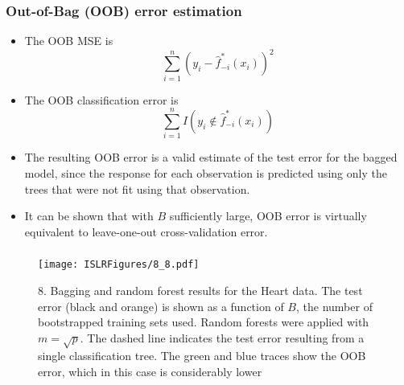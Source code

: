 \documentclass{beamer}
\begin{document}
                       \begin{frame}
                       	\frametitle{Out-of-Bag (OOB) error estimation  }
                       	\begin{itemize}
                       		\item  The OOB MSE is
                       		$$ \sum_{i=1}^n  (y_i - \hat f^*_{{-i}}(x_i))^2$$
                       		
                       		\item The OOB classification error is 
                       		$$ \sum_{i=1}^n  I(y_i \notin \hat f^*_{{-i}}(x_i))$$
                       		
                       		\item The resulting OOB error is a valid
                       		estimate of the test error for the bagged model, since the response for each
                       		observation is predicted using only the trees that were not fit using that
                       		observation.
                       	 
                       	  \item	It can
                       		be shown that with $B$ sufficiently large, OOB error is virtually equivalent
                       		to leave-one-out cross-validation error.
                       		
                       	\end{itemize}
                       \end{frame} 
                   
                 \begin{frame}
                 	\frametitle{ }
                 	\begin{figure}
                 		\centering
                 		
                 		\centering
                 		\texttt{[image: ISLRFigures/8\_8.pdf]}
                 		\caption{\scriptsize 8. Bagging and random forest results for the Heart data. The test
                 			error (black and orange) is shown as a function of $B$, the number of bootstrapped
                 			training sets used. Random forests were applied with $m = \sqrt{p}$.  The dashed line
                 			indicates the test error resulting from a single classification tree. The green and
                 			blue traces show the OOB error, which in this case is considerably lower
                 		}
                 	\end{figure}
                 \end{frame}
\end{document}
